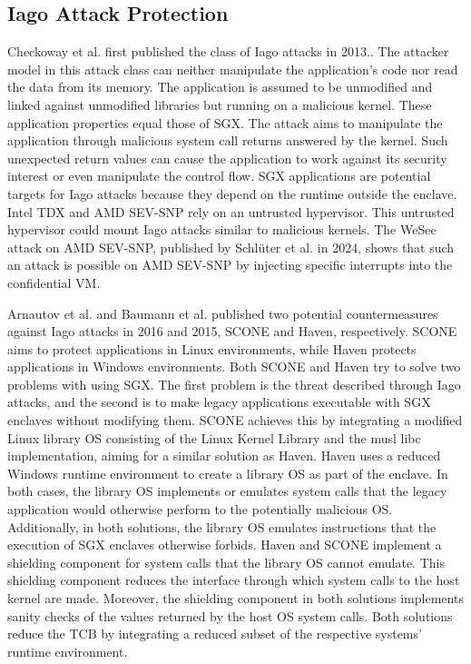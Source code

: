\subsection{Iago Attack Protection}
\label{sec:20:iago}
Checkoway et al. first published the class of Iago attacks in 2013.\cite{checkoway2013iago}. The attacker model in this
attack class can neither manipulate the application's code nor read the data from its memory. The
application is assumed to be unmodified and linked against unmodified libraries but running on a malicious kernel.
These application properties equal those of SGX. The attack aims to manipulate the application through
malicious system call returns answered by the kernel. Such unexpected return values can cause the application to work
against its security interest or even manipulate the control flow.
SGX applications are potential targets for Iago attacks because they depend on the runtime outside the
enclave. Intel TDX and AMD SEV-SNP rely on an untrusted hypervisor.\cite{tdx_whitepaper,kaplan_amd_2020}
This untrusted hypervisor could mount Iago attacks similar to malicious kernels. The WeSee attack on
AMD SEV-SNP, published by Schlüter et al. in 2024, shows that such an attack is possible on AMD SEV-SNP by
injecting specific interrupts into the confidential VM.\cite{schluter2024wesee}

Arnautov et al. and Baumann et al. published two potential countermeasures against Iago attacks in 2016 and 2015,
SCONE and Haven, respectively. SCONE aims to protect applications in Linux environments, while Haven protects
applications in Windows environments.\cite{arnautov_scone_2016, baumann_shielding_2015}
Both SCONE and Haven try to solve two problems with using SGX. The first problem is the threat described through Iago
attacks, and the second is to make legacy applications executable with SGX enclaves without
modifying them. SCONE achieves this by integrating a modified Linux library OS consisting of the Linux Kernel Library
and the musl libc implementation, aiming for a similar solution as Haven. Haven uses a reduced Windows runtime
environment to create a library OS as part of the enclave. In both cases, the library OS implements or emulates system
calls that the legacy application would otherwise perform to the potentially malicious OS. Additionally, in both
solutions, the library OS emulates instructions that the execution of SGX enclaves otherwise forbids. Haven and SCONE
implement a shielding component for system calls that the library OS cannot emulate. This shielding component
reduces the interface through which system calls to the host kernel are made. Moreover, the shielding component in both
solutions implements sanity checks of the values returned by the host OS system calls. Both solutions reduce the TCB by
integrating a reduced subset of the respective systems' runtime environment.

